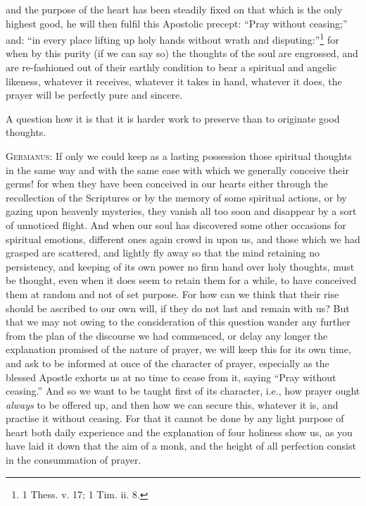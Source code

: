 and the purpose of the heart has been steadily fixed on that which is the only highest good, he will then fulfil this Apostolic precept: “Pray without ceasing;” and: “in every place lifting up holy hands without wrath and disputing:”\footnote{1 Thess. v. 17; 1 Tim. ii. 8.} for when by this purity (if we can say so) the thoughts of the soul are engrossed, and are re-fashioned out of their earthly condition to bear a spiritual and angelic likeness, whatever it receives, whatever it takes in hand, whatever it does, the prayer will be perfectly pure and sincere.


A question how it is that it is harder work to preserve than to originate good thoughts.

\textsc{Germanus}: If only we could keep as a lasting possession those spiritual thoughts in the same way and with the same ease with which we generally conceive their germs! for when they have been conceived in our hearts either through the recollection of the Scriptures or by the memory of some spiritual actions, or by gazing upon heavenly mysteries, they vanish all too soon and disappear by a sort of unnoticed flight. And when our soul has discovered some other occasions for spiritual emotions, different ones again crowd in upon us, and those which we had grasped are scattered, and lightly fly away so that the mind retaining no persistency, and keeping of its own power no firm hand over holy thoughts, must be thought, even when it does seem to retain them for a while, to have conceived them at random and not of set purpose. For how can we think that their rise should be ascribed to our own will, if they do not last and remain with us? But that we may not owing to the consideration of this question wander any further from the plan of the discourse we had commenced, or delay any longer the explanation promised of the nature of prayer, we will keep this for its own time, and ask to be informed at once of the character of prayer, especially as the blessed Apostle exhorts us at no time to cease from it, saying “Pray without ceasing.” And so we want to be taught first of its character, i.e., how prayer ought \emph{always} to be offered up, and then how we can secure this, whatever it is, and practise it without ceasing. For that it cannot be done by any light purpose of heart both daily experience and the explanation of four holiness show us, as you have laid it down that the aim of a monk, and the height of all perfection consist in the consummation of prayer.

